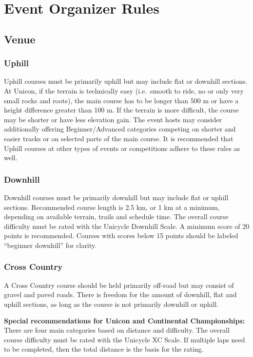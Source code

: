 \chapter{Event Organizer Rules}

\section{Venue}

\subsection{Uphill}
Uphill courses must be primarily uphill but may include flat or downhill sections.
At Unicon, if the terrain is technically easy (i.e.\ smooth to ride, no or only very small rocks and roots), the main course has to be longer than 500 m or have a height difference greater than 100 m.
If the terrain is more difficult, the course may be shorter or have less elevation gain.
The event hosts may consider additionally offering Beginner/Advanced categories competing on shorter and easier tracks or on selected parts of the main course.
It is recommended that Uphill courses at other types of events or competitions adhere to these rules as well.

\subsection{Downhill}
Downhill courses must be primarily downhill but may include flat or uphill sections.
Recommended course length is 2.5 km, or 1 km at a minimum, depending on available terrain, trails and schedule time.
The overall course difficulty must be rated with the Unicycle Downhill Scale.
A minimum score of 20 points is recommended.
Courses with scores below 15 points should be labeled ``beginner downhill'' for clarity.

\subsection{Cross Country}
A Cross Country course should be held primarily off-road but may consist of gravel and paved roads.
There is freedom for the amount of downhill, flat and uphill sections, as long as the course is not primarily downhill or uphill.

\textbf{Special recommendations for Unicon and Continental Championships:}\\
There are four main categories based on distance and difficulty.
The overall course difficulty must be rated with the Unicycle XC Scale.
If multiple laps need to be completed, then the total distance is the basis for the rating.

